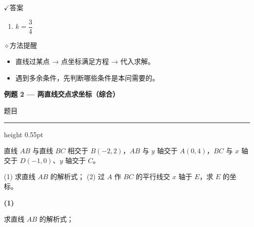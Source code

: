 \documentclass{exam-zh}
\newcommand{\eduSectionTitle}[1]{%
  \needspace{5\baselineskip}%
  \vspace{2mm}
  {\color{edu-blue}\bfseries\large #1}\par
  \vspace{3mm}
}
\newenvironment{eduSubQuestionItem}[1]{%
  \needspace{4\baselineskip}%
  \vspace{2mm}
  \par\noindent
  \hangindent=8mm\hangafter=1
  {\color{edu-blue}\bfseries #1}\enspace
  \begingroup
  \color{edu-ink}
}{%
  \endgroup
  \par
  \vspace{3mm}
}
\newcommand{\eduIconCheck}{\(\checkmark\)}
\newcommand{\eduIconPin}{\(\diamond\)}
\newenvironment{eduProblemBlock}[1][题目]{%
  \needspace{8\baselineskip}
  {\small\color{edu-muted}#1}\par
  \vspace{1.5mm}
  {\color{edu-blue}\hrule height 0.55pt}
  \vspace{4.5mm}
  \begingroup
  \color{edu-ink}
  \large
  \setlength{\parskip}{2.2mm}
  \linespread{1.20}\selectfont
}{%
  \par
  \endgroup
  \vspace{6mm}
}
\newenvironment{eduBulletList}{%
  \begin{itemize}[
    label=\textbullet,
    leftmargin=5mm,
    itemsep=1.2mm,
    topsep=0pt,
    parsep=0pt
  ]
}{%
  \end{itemize}
}
\newenvironment{eduBottomGrid}{%
  \vspace{1mm}
  \par\noindent
}{%
  \par\vspace{1mm}
}
\newenvironment{eduSummaryLeft}{%
  \begin{minipage}[t]{0.30\linewidth}
}{%
  \end{minipage}
}
\newcommand{\eduSummaryDivider}{%
  \hspace{4mm}{\color{edu-line}\vrule width 0.35pt}\hspace{7mm}%
}
\newenvironment{eduSummaryRight}{%
  \begin{minipage}[t]{0.58\linewidth}
}{%
  \end{minipage}
}
\newenvironment{eduPlainList}{%
  \begin{enumerate}[
    label=(\arabic*),
    leftmargin=7mm,
    itemsep=1.2mm,
    topsep=0pt,
    parsep=0pt
  ]
}{%
  \end{enumerate}
}
\begin{document}
\begin{eduBottomGrid}
  \begin{eduSummaryLeft}
    \begin{eduSummaryBlock}{\eduIconCheck}{答案}
    \begin{eduPlainList}
      \item $k = \dfrac{3}{4}$    \end{eduPlainList}
    \end{eduSummaryBlock}
  \end{eduSummaryLeft}
  \eduSummaryDivider
  \begin{eduSummaryRight}
    \begin{eduSummaryBlock}{\eduIconPin}{方法提醒}
    \begin{eduBulletList}
      \item 直线过某点 → 点坐标满足方程 → 代入求解。      \item 遇到多余条件，先判断哪些条件是本问需要的。    \end{eduBulletList}
    \end{eduSummaryBlock}
  \end{eduSummaryRight}
\end{eduBottomGrid}



\eduSectionTitle{例题 2 — 两直线交点求坐标（综合）}

\begin{eduProblemBlock}[题目]
直线 $AB$ 与直线 $BC$ 相交于 $B(-2,2)$，$AB$ 与 $y$ 轴交于 $A(0,4)$，$BC$ 与 $x$ 轴交于 $D(-1,0)$、$y$ 轴交于 $C$。

(1) 求直线 $AB$ 的解析式；
(2) 过 $A$ 作 $BC$ 的平行线交 $x$ 轴于 $E$，求 $E$ 的坐标。
\end{eduProblemBlock}









\begin{eduSubQuestionItem}{(1)}
求直线 $AB$ 的解析式；\end{eduSubQuestionItem}
\end{document}
